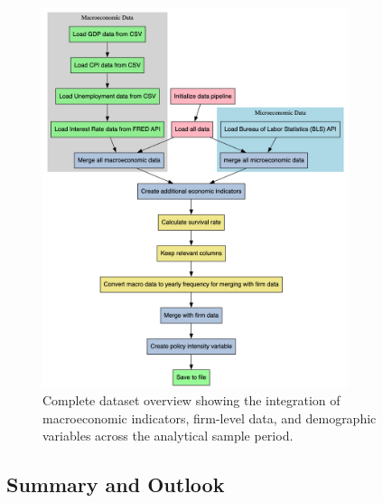 \begin{figure}[htbp]
\centering
\includegraphics[width=0.8\textwidth]{images/wholedata.png}
\caption{Complete dataset overview showing the integration of macroeconomic indicators, firm-level data, and demographic variables across the analytical sample period.}
\label{fig:wholedata}
\end{figure}



\subsection{Summary and Outlook}

